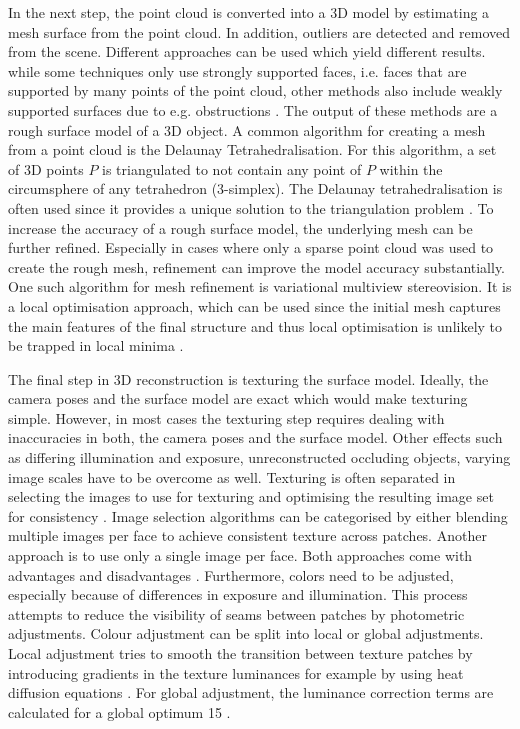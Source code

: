 In the next step, the point cloud is converted into a 3D model by estimating a mesh surface from the point cloud. In addition, outliers are detected and removed from the scene. Different approaches can be used which yield different results. while some techniques only use strongly supported faces, i.e. faces that are supported by many points of the point cloud, other methods also include weakly supported surfaces due to e.g. obstructions \cite{Jancosek2014ExploitingSurfaces}. The output of these methods are a rough surface model of a 3D object.
A common algorithm for creating a mesh from a point cloud is the Delaunay Tetrahedralisation. For this algorithm, a set of 3D points $P$ is triangulated to not contain any point of $P$ within the circumsphere of any tetrahedron (3-simplex). The Delaunay tetrahedralisation is often used since it provides a unique solution to the triangulation problem \cite{vu2012high}.
To increase the accuracy of a rough surface model, the underlying mesh can be further refined. Especially in cases where only a sparse point cloud was used to create the rough mesh, refinement can improve the model accuracy substantially. One such algorithm for mesh refinement is variational multiview stereovision. It is a local optimisation approach, which can be used since the initial mesh captures the main features of the final structure and thus local optimisation is unlikely to be trapped in local minima \cite{Faugeras1998VariationalProblem, vu2012high}.

The final step in 3D reconstruction is texturing the surface model. Ideally, the camera poses and the surface model are exact which would make texturing simple. However, in most cases the texturing step requires dealing with inaccuracies in both, the camera poses and the surface model. Other effects such as differing illumination and exposure, unreconstructed occluding objects, varying image scales have to be overcome as well. Texturing is often separated in selecting the images to use for texturing and optimising the resulting image set for consistency \cite{Waechter2014LetReconstructions}.
Image selection algorithms can be categorised by either blending multiple images per face to achieve consistent texture across patches. Another approach is to use only a single image per face. Both approaches come with advantages and disadvantages \cite{Waechter2014LetReconstructions}.
Furthermore, colors need to be adjusted, especially because of differences in exposure and illumination. This process attempts to reduce the visibility of seams between patches by photometric adjustments. Colour adjustment can be split into local or global adjustments. Local adjustment tries to smooth the transition between texture patches by introducing gradients in the texture luminances for example by using heat diffusion equations \cite{Velho2007ProjectivePhotography}. For global adjustment, the luminance correction terms are calculated for a global optimum 15 \cite{Lempitsky2007SeamlessMaps}.


